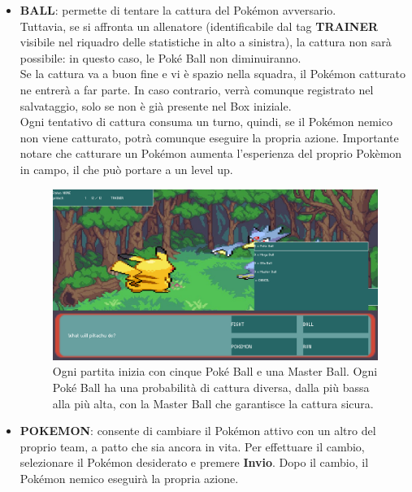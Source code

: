 \documentclass[a4paper,12pt]{report}
\begin{document}
{{\begin{itemize}
  \item \textbf{BALL}: permette di tentare la cattura del Pokémon avversario.\\
  Tuttavia, se si affronta un allenatore (identificabile dal tag \textbf{TRAINER} visibile nel riquadro delle statistiche in alto a sinistra), la cattura non sarà possibile: in questo caso, le Poké Ball non diminuiranno.\\
  Se la cattura va a buon fine e vi è spazio nella squadra, il Pokémon catturato ne entrerà a far parte. In caso contrario, verrà comunque registrato nel salvataggio, solo se non è già presente nel Box iniziale.\\
  Ogni tentativo di cattura consuma un turno, quindi, se il Pokémon nemico non viene catturato, potrà comunque eseguire la propria azione. Importante notare che catturare un Pokémon aumenta l'esperienza del proprio Pokèmon in campo, il che può portare a un level up.

  \begin{figure}[H]
    \centering
    \includegraphics[width=\textwidth]{immagini/ballImg.png}
    \caption{Ogni partita inizia con cinque Poké Ball e una Master Ball. Ogni Poké Ball ha una probabilità di cattura diversa, dalla più bassa alla più alta, con la Master Ball che garantisce la cattura sicura.}
    \label{fig:ball_display}
  \end{figure}

  \item \textbf{POKEMON}: consente di cambiare il Pokémon attivo con un altro del proprio team, a patto che sia ancora in vita. Per effettuare il cambio, selezionare il Pokémon desiderato e premere \textbf{Invio}. Dopo il cambio, il Pokémon nemico eseguirà la propria azione.


\end{itemize}}}
\end{document}
